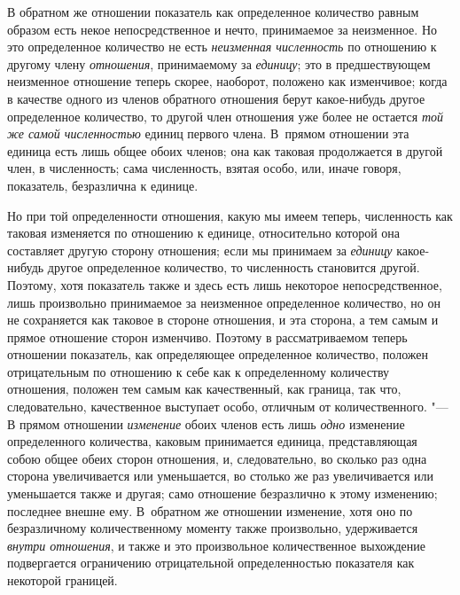 В обратном же отношении показатель как определенное количество равным
образом есть некое непосредственное и нечто, принимаемое за неизменное. Но
это определенное количество не есть {\em неизменная
численность }по отношению к другому члену
{\em отношения}, принимаемому за
{\em единицу}; это в предшествующем неизменное
отношение теперь скорее, наоборот, положено как изменчивое; когда в
качестве одного из членов обратного отношения берут какое-нибудь другое
определенное количество, то другой член отношения уже более не остается
{\em той же самой численностью} единиц первого члена.
В~прямом отношении эта единица есть лишь общее обоих членов; она как таковая
продолжается в другой член, в численность; сама численность, взятая особо,
или, иначе говоря, показатель, безразлична к единице.

Но при той определенности отношения, какую мы имеем теперь, численность как
таковая изменяется по отношению к единице, относительно которой она
составляет другую сторону отношения; если мы принимаем за
{\em единицу} какое-нибудь другое определенное
количество, то численность становится другой. Поэтому, хотя показатель
также и здесь есть лишь некоторое непосредственное, лишь произвольно
принимаемое за неизменное определенное количество, но он не сохраняется как
таковое в стороне отношения, и эта сторона, а тем самым и прямое отношение
сторон изменчиво. Поэтому в рассматриваемом теперь отношении показатель,
как определяющее определенное количество, положен отрицательным по
отношению к себе как к определенному количеству отношения, положен тем
самым как качественный, как граница, так что, следовательно, качественное
выступает особо, отличным от количественного. "--- В прямом отношении
{\em изменение} обоих членов есть лишь
{\em одно} изменение определенного количества, каковым
принимается единица, представляющая собою общее обеих сторон отношения, и,
следовательно, во сколько раз одна сторона увеличивается или уменьшается,
во столько же раз увеличивается или уменьшается также и другая; само
отношение безразлично к этому изменению; последнее внешне ему. В~обратном
же отношении изменение, хотя оно по безразличному количественному моменту
также произвольно, удерживается {\em внутри отношения},
и также и это произвольное количественное выхождение подвергается
ограничению отрицательной определенностью показателя как некоторой
границей.

